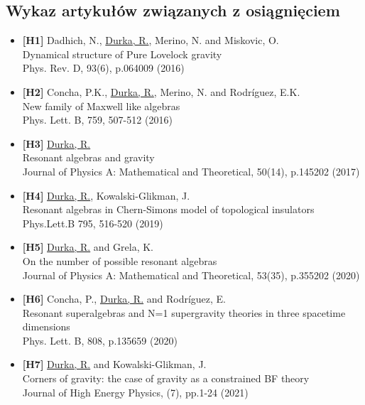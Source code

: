 \documentclass[12pt,a4paper]{article}
\begin{document}
\newpage
\subsection{Wykaz artykułów związanych z osiągnięciem}
\begin{itemize}
	\item{\textbf{[H1]}} Dadhich, N., \underline{Durka, R.}, Merino, N. and Miskovic, O.\\ Dynamical structure of Pure Lovelock gravity\\ Phys. Rev. D, 93(6), p.064009 (2016)
	
	\item{\textbf{[H2]}} Concha, P.K., \underline{Durka, R.}, Merino, N. and Rodríguez, E.K.\\ New family of Maxwell like algebras\\ Phys. Lett. B, 759, 507-512 (2016)
	
	\item{\textbf{[H3]}} \underline{Durka, R.}\\ Resonant algebras and gravity\\ Journal of Physics A: Mathematical and Theoretical, 50(14), p.145202 (2017)
	
	\item{\textbf{[H4]}} \underline{Durka, R.}, Kowalski-Glikman, J.\\ Resonant algebras in Chern-Simons model of topological insulators\\ Phys.Lett.B 795, 516-520 (2019)
	
	\item{\textbf{[H5]}} \underline{Durka, R.} and Grela, K.\\ On the number of possible resonant algebras\\ Journal of Physics A: Mathematical and Theoretical, 53(35), p.355202 (2020)
	
	\item{\textbf{[H6]}} Concha, P., \underline{Durka, R.} and Rodríguez, E.\\Resonant superalgebras and N=1 supergravity theories in three spacetime dimensions\\ Phys. Lett. B, 808, p.135659 (2020)
	
	\item{\textbf{[H7]}} \underline{Durka, R.} and Kowalski-Glikman, J.\\ Corners of gravity: the case of gravity as a constrained BF theory\\ Journal of High Energy Physics, (7), pp.1-24 (2021)
	

\end{itemize}
\end{document}
